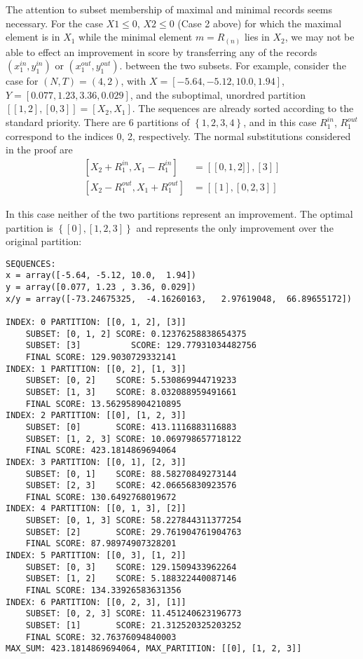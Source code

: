 \documentclass{article}
\theoremstyle{case}
\begin{document}
\vspace{16pt}

The attention to subset membership of maximal and minimal records seems necessary. For the case $X1 \leq 0$, $X2 \leq 0$ (Case 2 above) for which the maximal element is in $X_1$ while the minimal element $m = R_{(n)}$ lies in $X_2$, we may not be able to effect an improvement in score by transferring any of the records $\left( x_1^{in}, y_1^{in}\right)$ or $\left( x_1^{out}, y_1^{out}\right)$. between the two subsets. For example, consider the case for $\left( N, T\right) = \left( 4, 2\right)$, with $X = [-5.64, -5.12, 10.0,  1.94]$, $Y = [0.077, 1.23 , 3.36, 0.029]$, and the suboptimal, unordred partition $\left[ \left[ 1, 2\right], \left[ 0, 3\right] \right] = \left[ X_2, X_1\right]$. The sequences are already sorted according to the standard priority. There are 6 partitions of $\left\lbrace 1, 2, 3, 4\right\rbrace$, and in this case $R_1^{in}$, $R_1^{out}$ correspond to the indices 0, 2, respectively. The normal substitutions considered in the proof are
\begin{align*}
\left[ X_2 + R_1^{in}, X_1 - R_1^{in}\right] & = \left[ \left[0,1,2] \right], \left[ 3\right] \right] \\
\left[ X_2 - R_1^{out}, X_1 + R_1^{out}\right] & = \left[ \left[ 1 \right], \left[ 0, 2, 3 \right] \right]
\end{align*}

In this case neither of the two partitions represent an improvement. The optimal partition is $\left\lbrace \left[ 0 \right], \left[ 1, 2, 3\right]\right\rbrace$ and represents the only improvement over the original partition:

\begin{verbatim}
SEQUENCES:
x = array([-5.64, -5.12, 10.0,  1.94])
y = array([0.077, 1.23 , 3.36, 0.029])
x/y = array([-73.24675325,  -4.16260163,   2.97619048,  66.89655172])

INDEX: 0 PARTITION: [[0, 1, 2], [3]]
    SUBSET: [0, 1, 2] SCORE: 0.12376258838654375
    SUBSET: [3] 		 SCORE: 129.77931034482756
    FINAL SCORE: 129.9030729332141
INDEX: 1 PARTITION: [[0, 2], [1, 3]]
    SUBSET: [0, 2]    SCORE: 5.530869944719233
    SUBSET: [1, 3]    SCORE: 8.032088959491661
    FINAL SCORE: 13.562958904210895
INDEX: 2 PARTITION: [[0], [1, 2, 3]]
	SUBSET: [0]       SCORE: 413.1116883116883
    SUBSET: [1, 2, 3] SCORE: 10.069798657718122
    FINAL SCORE: 423.1814869694064
INDEX: 3 PARTITION: [[0, 1], [2, 3]]
    SUBSET: [0, 1]    SCORE: 88.58270849273144
    SUBSET: [2, 3]    SCORE: 42.06656830923576
    FINAL SCORE: 130.6492768019672
INDEX: 4 PARTITION: [[0, 1, 3], [2]]
    SUBSET: [0, 1, 3] SCORE: 58.227844311377254
    SUBSET: [2]       SCORE: 29.761904761904763
    FINAL SCORE: 87.98974907328201
INDEX: 5 PARTITION: [[0, 3], [1, 2]]
    SUBSET: [0, 3]    SCORE: 129.1509433962264
    SUBSET: [1, 2]    SCORE: 5.188322440087146
    FINAL SCORE: 134.33926583631356
INDEX: 6 PARTITION: [[0, 2, 3], [1]]
    SUBSET: [0, 2, 3] SCORE: 11.451240623196773
    SUBSET: [1]       SCORE: 21.312520325203252
    FINAL SCORE: 32.76376094840003
MAX_SUM: 423.1814869694064, MAX_PARTITION: [[0], [1, 2, 3]]

\end{verbatim}
\end{document}
